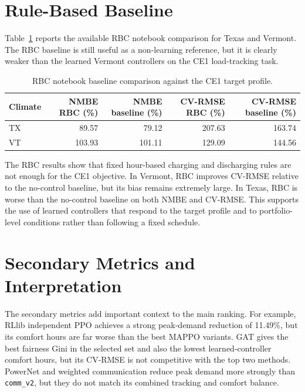 \section{Rule-Based Baseline}

Table~\ref{tab:rbc-baseline-results} reports the available RBC notebook
comparison for Texas and Vermont. The RBC baseline is still useful as a
non-learning reference, but it is clearly weaker than the learned Vermont
controllers on the CE1 load-tracking task.

\begin{table}[h]
\small
\begin{center}
\begin{tabular}{|l|r|r|r|r|}
\hline
Climate & NMBE RBC (\%) & NMBE baseline (\%) & CV-RMSE RBC (\%) & CV-RMSE baseline (\%) \\
\hline
TX & 89.57 & 79.12 & 207.63 & 163.74 \\
VT & 103.93 & 101.11 & 129.09 & 144.56 \\
\hline
\end{tabular}
\end{center}
\caption{RBC notebook baseline comparison against the CE1 target profile.}
\label{tab:rbc-baseline-results}
\end{table}

The RBC results show that fixed hour-based charging and discharging rules are
not enough for the CE1 objective. In Vermont, RBC improves CV-RMSE relative to
the no-control baseline, but its bias remains extremely large. In Texas, RBC is
worse than the no-control baseline on both NMBE and CV-RMSE. This supports the
use of learned controllers that respond to the target profile and to
portfolio-level conditions rather than following a fixed schedule.

\section{Secondary Metrics and Interpretation}

The secondary metrics add important context to the main ranking. For example,
RLlib independent PPO achieves a strong peak-demand reduction of 11.49\%, but
its comfort hours are far worse than the best MAPPO variants. GAT gives the
best fairness Gini in the selected set and also the lowest learned-controller
comfort hours, but its CV-RMSE is not competitive with the top two methods.
PowerNet and weighted communication reduce peak demand more strongly than
\texttt{comm\_v2}, but they do not match its combined tracking and comfort
balance.


